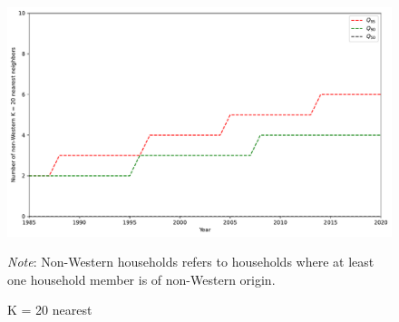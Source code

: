 \documentclass[../main.tex]{subfiles}
\begin{document}
\begin{figure}[H]
    \centering
    \caption{K = 20 nearest }
    \includegraphics[width=0.7\linewidth]{figs/mix_non_west_pos_nn_quantiles_1985_2020.pdf}
        \begin{minipage}{.7\linewidth}
        \footnotesize \textit{Note}: Non-Western households refers to households where at least one household member is of non-Western origin.
    \end{minipage}
\end{figure}
\end{document}
